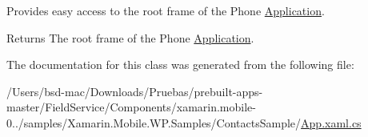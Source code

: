 Provides easy access to the root frame of the Phone \hyperlink{class_contacts_sample_1_1_application}{Application}. 

\begin{DoxyReturn}{Returns}
The root frame of the Phone \hyperlink{class_contacts_sample_1_1_application}{Application}.
\end{DoxyReturn}


The documentation for this class was generated from the following file\+:\begin{DoxyCompactItemize}
\item 
/\+Users/bsd-\/mac/\+Downloads/\+Pruebas/prebuilt-\/apps-\/master/\+Field\+Service/\+Components/xamarin.\+mobile-\/0../samples/\+Xamarin.\+Mobile.\+W\+P.\+Samples/\+Contacts\+Sample/\hyperlink{_components_2xamarin_8mobile-0_86_81_2samples_2_xamarin_8_mobile_8_w_p_8_samples_2_contacts_sample_2_app_8xaml_8cs}{App.\+xaml.\+cs}\end{DoxyCompactItemize}
